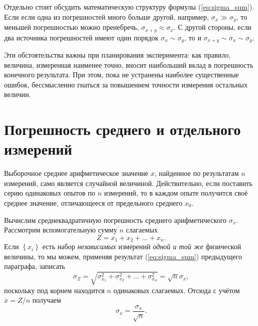 
Отдельно стоит обсудить математическую структуру формулы (\ref{eq:sigma_sum}).
Если если одна из погрешностей много больше другой, например, $\sigma_{x}\gg\sigma_{y}$,
то меньшей погрешностью можно пренебречь, $\sigma_{x+y}\approx\sigma_{x}$.
С другой стороны, если два источника погрешностей имеют один порядок
$\sigma_{x}\sim\sigma_{y}$, то и $\sigma_{x+y}\sim\sigma_{x}\sim\sigma_{y}$. 

Эти обстоятельства важны при планирования эксперимента: как правило,
величина, измеренная наименее точно, вносит наибольший вклад в погрешность
конечного результата. При этом, пока не устранены наиболее существенные
ошибок, бессмысленно гнаться за повышением точности измерения остальных
величин.


\section{Погрешность среднего и отдельного измерений\label{sec:average}}

Выборочное среднее арифметическое значение $\overline{x}$, найденное
по результатам $n$ измерений, само является случайной величиной.
Действительно, если поставить серию одинаковых опытов по $n$ измерений,
то в каждом опыте получится своё среднее значение, отличающееся от
предельного среднего $x_{0}$.

Вычислим среднеквадратичную погрешность среднего арифметического $\sigma_{\overline{x}}$.
Рассмотрим вспомогательную сумму $n$ слагаемых 
\[
Z=x_{1}+x_{2}+\ldots+x_{n}.
\]
Если $\left\{ x_{i}\right\} $ есть набор \emph{независимых} измерений
\emph{одной и той же} физической величины, то мы можем, применяя результат
(\ref{eq:sigma_sum}) предыдущего параграфа, записать
\[
\sigma_{Z}=\sqrt{\sigma_{x_{1}}^{2}+\sigma_{x_{2}}^{2}+\ldots+\sigma_{x_{n}}^{2}}=\sqrt{n}\sigma_{x},
\]
поскольку под корнем находится $n$ одинаковых слагаемых. Отсюда с
учётом $\overline{x}=Z/n$ получаем
\begin{equation}
\boxed{{\sigma_{\overline{x}}=\frac{\sigma_{x}}{\sqrt{n}}}}.\label{eq:sigma_avg}
\end{equation}

